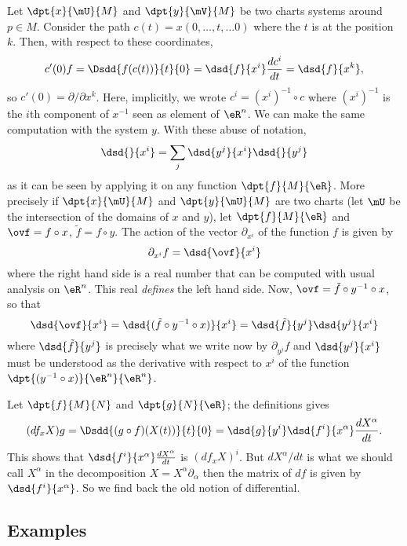 Let $\dpt{x}{\mU}{M}$ and $\dpt{y}{\mV}{M}$ be two charts systems around $p\in M$. Consider the path $c(t)=x(0,\ldots,t,\ldots 0)$ where the $t$ is at the position $k$. Then, with respect to these coordinates,
\[
  c'(0)f=\Dsdd{ f(c(t))  }{t}{0}=\dsd{f}{x^i}\frac{dc^i}{dt}=\dsd{f}{x^k},
\]
so $c'(0)=\partial/\partial x^k$. Here, implicitly, we wrote $c^i=(x^i)^{-1}\circ c$ where $(x^i)^{-1}$ is the $i$th component of $x^{-1}$ seen as element of $\eR^n$. We can make the same computation with the system $y$. With these abuse of notation,
\begin{equation}
   \dsd{}{x^i}=\sum_j\dsd{y^j}{x^i}\dsd{}{y^j}
\end{equation}
as it can be seen by applying it on any function $\dpt{f}{M}{\eR}$. More precisely if $\dpt{x}{\mU}{M}$ and $\dpt{y}{\mU}{M}$ are two charts (let $\mU$ be the intersection of the domains of $x$ and $y$), let $\dpt{f}{M}{\eR}$ and $\ovf=f\circ x$, $\tilde f =f\circ y$. The action of the vector $\partial_{x^i}$ of the function $f$ is given by
\[
  \partial_{x^i}f=\dsd{\ovf}{x^i}
\]
where the right hand side is a real number that can be computed with usual analysis on $\eR^n$. This real \emph{defines} the left hand side. Now, $\ovf=\tilde f \circ y^{-1}\circ x$, so that
\[
   \dsd{\ovf}{x^i}=\dsd{ (\tilde f \circ y^{-1}\circ x) }{x^i}=\dsd{\tilde f }{y^j}\dsd{y^j}{x^i}
\]
where $\dsd{\tilde f }{y^j}$ is precisely what we write now by $\partial_{y^j}f$ and $\dsd{y^j}{x^i}$ must be understood as the derivative with respect to $x^i$ of the function $\dpt{(y^{-1}\circ x)}{\eR^n}{\eR^n}$.

Let $\dpt{f}{M}{N}$ and $\dpt{g}{N}{\eR}$; the definitions gives
\[
  (df_xX)g=\Dsdd{(g\circ f)(X(t))}{t}{0}
          =\dsd{g}{y^i}\dsd{f^i}{x^{\alpha}}\frac{dX^{\alpha}}{dt}.
\]
This shows that $\dsd{f^i}{x^{\alpha}}\frac{dX^{\alpha}}{dt}$ is $(df_xX)^i$.  But $dX^{\alpha}/dt$ is what we should call $X^{\alpha}$ in the decomposition $X=X^{\alpha}\partial_{\alpha}$ then the matrix of $df$ is given by $\dsd{f^i}{x^{\alpha}}$. So we find back the old notion of differential.

\subsection{Examples}

